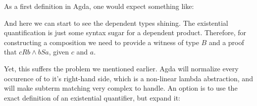 As a first definition in Agda, one would expect something like:


And here we can start to see the dependent types shining. The existential quantification
is just some syntax sugar for a dependent product. Therefore, for constructing a composition
we need to provide a witness of type $B$ and a proof that $c R b \wedge b S a$, given $c$ and $a$.

Yet, this suffers the problem we mentioned earlier. Agda will normalize every occurence of 
to it's right-hand side, which is a non-linear lambda abstraction, and will make subterm matching 
very complex to handle. An option is to use the exact definition of an existential quantifier,
but expand it:








